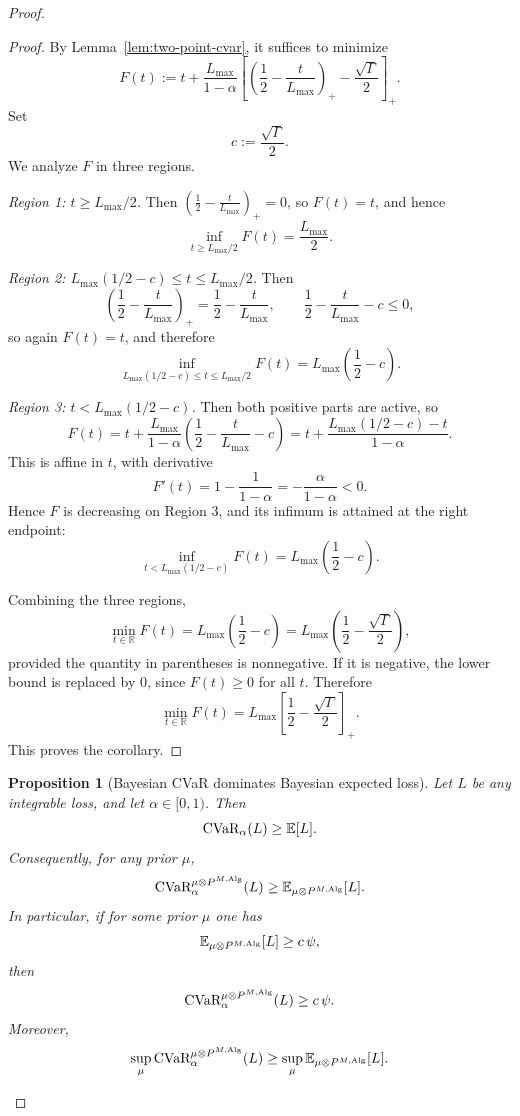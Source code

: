 \documentclass[conference]{IEEEtran}
\newtheorem{proposition}{Proposition}
\begin{document}
\begin{proof}[Proof]
\begin{proof}
By Lemma~\ref{lem:two-point-cvar}, it suffices to minimize
\[
F(t):=
t+\frac{L_{\max}}{1-\alpha}
\left[
\left(\frac12-\frac{t}{L_{\max}}\right)_+
-\frac{\sqrt{\Gamma}}{2}
\right]_+.
\]
Set
\[
c:=\frac{\sqrt{\Gamma}}{2}.
\]
We analyze \(F\) in three regions.

\smallskip
\noindent
\emph{Region 1: \(t\ge L_{\max}/2\).}
Then \(\left(\frac12-\frac{t}{L_{\max}}\right)_+=0\), so \(F(t)=t\), and hence
\[
\inf_{t\ge L_{\max}/2}F(t)=\frac{L_{\max}}{2}.
\]

\smallskip
\noindent
\emph{Region 2: \(L_{\max}(1/2-c)\le t\le L_{\max}/2\).}
Then
\[
\left(\frac12-\frac{t}{L_{\max}}\right)_+=\frac12-\frac{t}{L_{\max}},
\qquad
\frac12-\frac{t}{L_{\max}}-c\le 0,
\]
so again \(F(t)=t\), and therefore
\[
\inf_{L_{\max}(1/2-c)\le t\le L_{\max}/2}F(t)
=
L_{\max}\left(\frac12-c\right).
\]

\smallskip
\noindent
\emph{Region 3: \(t<L_{\max}(1/2-c)\).}
Then both positive parts are active, so
\[
F(t)
=
t+\frac{L_{\max}}{1-\alpha}\left(\frac12-\frac{t}{L_{\max}}-c\right)
=
t+\frac{L_{\max}(1/2-c)-t}{1-\alpha}.
\]
This is affine in \(t\), with derivative
\[
F'(t)=1-\frac{1}{1-\alpha}=-\frac{\alpha}{1-\alpha}<0.
\]
Hence \(F\) is decreasing on Region 3, and its infimum is attained at the right endpoint:
\[
\inf_{t<L_{\max}(1/2-c)}F(t)
=
L_{\max}\left(\frac12-c\right).
\]

Combining the three regions,
\[
\min_{t\in\mathbb{R}}F(t)
=
L_{\max}\left(\frac12-c\right)
=
L_{\max}\left(\frac12-\frac{\sqrt{\Gamma}}{2}\right),
\]
provided the quantity in parentheses is nonnegative. If it is negative, the lower bound is replaced by \(0\), since \(F(t)\ge 0\) for all \(t\). Therefore
\[
\min_{t\in\mathbb{R}}F(t)
=
L_{\max}\left[\frac12-\frac{\sqrt{\Gamma}}{2}\right]_+.
\]
This proves the corollary.
\end{proof}

\begin{proposition}[Bayesian \textup{CVaR} dominates Bayesian expected loss]
\label{prop:cvar-dominates-bayes-risk}
Let \(L\) be any integrable loss, and let \(\alpha\in[0,1)\). Then
\[
\textup{CVaR}_\alpha(L)\ge \mathbb{E}[L].
\]
Consequently, for any prior \(\mu\),
\[
\textup{CVaR}_\alpha^{\mu\otimes P^{M,\textup{Alg}}}(L)
\ge
\mathbb{E}_{\mu\otimes P^{M,\textup{Alg}}}[L].
\]
In particular, if for some prior \(\mu\) one has
\[
\mathbb{E}_{\mu\otimes P^{M,\textup{Alg}}}[L]\ge c\,\psi,
\]
then
\[
\textup{CVaR}_\alpha^{\mu\otimes P^{M,\textup{Alg}}}(L)\ge c\,\psi.
\]
Moreover,
\[
\sup_{\mu}\textup{CVaR}_\alpha^{\mu\otimes P^{M,\textup{Alg}}}(L)
\ge
\sup_{\mu}\mathbb{E}_{\mu\otimes P^{M,\textup{Alg}}}[L].
\]
\end{proposition}


\end{proof}
\end{document}
